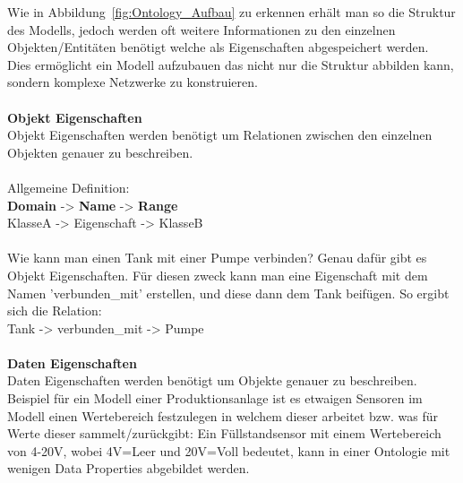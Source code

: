 Wie in Abbildung~\ref{fig:Ontology_Aufbau} zu erkennen erhält man so die Struktur des Modells, jedoch werden oft weitere Informationen zu den einzelnen Objekten/Entitäten benötigt welche als Eigenschaften abgespeichert werden.\\
Dies ermöglicht ein Modell aufzubauen das nicht nur die Struktur abbilden kann, sondern komplexe Netzwerke zu konstruieren.\\
\\
\noindent \textbf{Objekt Eigenschaften}\\
Objekt Eigenschaften werden benötigt um Relationen zwischen den einzelnen Objekten genauer zu beschreiben.\\
\\
Allgemeine Definition:\\
\textbf{Domain} -> \textbf{Name} -> \textbf{Range}\\
KlasseA -> Eigenschaft -> KlasseB\\
\\
Wie kann man einen Tank mit einer Pumpe verbinden? Genau dafür gibt es Objekt Eigenschaften. Für diesen zweck kann man eine Eigenschaft mit dem Namen 'verbunden\_mit' erstellen, und diese dann dem Tank beifügen. So ergibt sich die Relation:\\
Tank -> verbunden\_mit -> Pumpe\\
\\
\textbf{Daten Eigenschaften}\\
Daten Eigenschaften werden benötigt um Objekte genauer zu beschreiben. 
\\
Beispiel für ein Modell einer Produktionsanlage ist es etwaigen Sensoren im Modell einen Wertebereich festzulegen in welchem dieser arbeitet bzw. was für Werte dieser sammelt/zurückgibt: Ein Füllstandsensor mit einem Wertebereich von 4-20V, wobei 4V=Leer und 20V=Voll bedeutet, kann in einer Ontologie mit wenigen Data Properties abgebildet werden.

